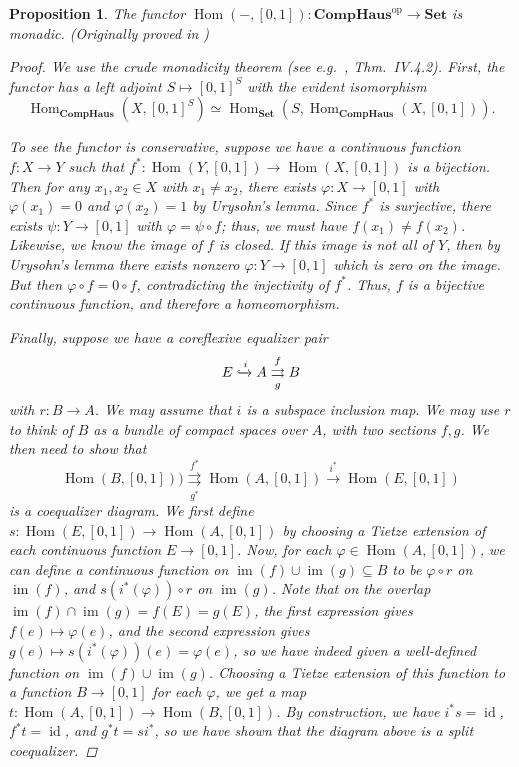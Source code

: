 \documentclass[a4paper,12pt,reqno]{amsart}
\newtheorem{proposition}{Proposition}
\newcommand{\Hom}{\operatorname{Hom}}
\newcommand{\op}{\operatorname{op}}
\newcommand{\CompHaus}{\mathbf{CompHaus}}
\newcommand{\Set}{\mathbf{Set}}
\newcommand{\im}{\operatorname{im}}
\newcommand{\id}{\operatorname{id}}
\begin{document}
\begin{proposition}
	The functor $\Hom({-}, [0, 1]) : \CompHaus^{\op} \to \Set$ is monadic. (Originally proved in \cite{Dus69})
	
	\begin{proof}
		We use the crude monadicity theorem (see e.g.~\cite{SGL}, Thm.~IV.4.2). First, the functor has a left adjoint $S \mapsto [0, 1]^S$ with the evident isomorphism
		$$\Hom_{\CompHaus}(X, [0, 1]^S) \simeq \Hom_{\Set}(S, \Hom_{\CompHaus}(X, [0, 1])). $$
		
		To see the functor is conservative, suppose we have a continuous function $f : X \to Y$ such that $f^* : \Hom(Y, [0, 1]) \to \Hom(X, [0, 1])$ is a bijection. Then for any $x_1, x_2 \in X$ with $x_1 \ne x_2$, there exists $\varphi : X \to [0, 1]$ with $\varphi(x_1) = 0$ and $\varphi(x_2) = 1$ by Urysohn's lemma. Since $f^*$ is surjective, there exists $\psi : Y \to [0, 1]$ with $\varphi = \psi \circ f$; thus, we must have $f(x_1) \ne f(x_2)$. Likewise, we know the image of $f$ is closed. If this image is not all of $Y$, then by Urysohn's lemma there exists nonzero $\varphi : Y \to [0, 1]$ which is zero on the image. But then $\varphi \circ f = 0 \circ f$, contradicting the injectivity of $f^*$. Thus, $f$ is a bijective continuous function, and therefore a homeomorphism.
		
		Finally, suppose we have a coreflexive equalizer pair
		$$E \xhookrightarrow{i} A \overset{f}{\underset{g}{\rightrightarrows}} B$$
		with $r : B \to A$. We may assume that $i$ is a subspace inclusion map. We may use $r$ to think of $B$ as a bundle of compact spaces over $A$, with two sections $f, g$. We then need to show that
		$$\Hom(B, [0,1])) \overset{f^*}{\underset{g^*}{\rightrightarrows}} \Hom(A, [0, 1]) \xrightarrow{i^*} \Hom(E, [0, 1])$$
		is a coequalizer diagram. We first define $s : \Hom(E,[0,1]) \to \Hom(A,[0,1])$ by choosing a Tietze extension of each continuous function $E \to [0,1]$. Now, for each $\varphi \in \Hom(A,[0,1])$, we can define a continuous function on $\im(f) \cup \im(g) \subseteq B$ to be $\varphi \circ r$ on $\im(f)$, and $s(i^*(\varphi))\circ r$ on $\im(g)$. Note that on the overlap $\im(f)\cap \im(g) = f(E) = g(E)$, the first expression gives $f(e) \mapsto \varphi(e)$, and the second expression gives $g(e) \mapsto s(i^*(\varphi))(e) = \varphi(e)$, so we have indeed given a well-defined function on $\im(f)\cup\im(g)$. Choosing a Tietze extension of this function to a function $B\to [0,1]$ for each $\varphi$, we get a map $t : \Hom(A,[0,1]) \to \Hom(B,[0,1])$. By construction, we have $i^* s = \id$, $f^* t = \id$, and $g^* t = s i^*$, so we have shown that the diagram above is a split coequalizer.
	\end{proof}
\end{proposition}
\end{document}
